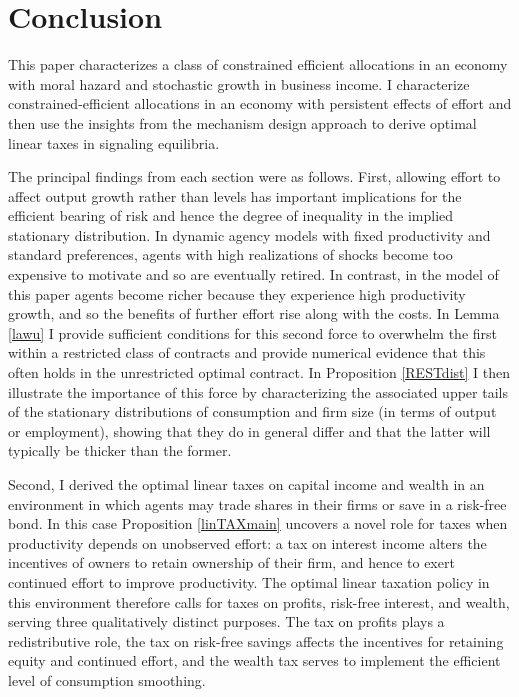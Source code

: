 \documentclass[11pt]{article}
\theoremstyle{plain}
\begin{document}
\section{Conclusion} \label{Conc}

This paper characterizes a class of constrained efficient allocations in an economy with moral hazard and stochastic growth in business income. I characterize constrained-efficient allocations in an economy with persistent effects of effort and then use the insights from the mechanism design approach to derive optimal linear taxes in signaling equilibria. 


The principal findings from each section were as follows. First, allowing effort to affect output growth rather than levels has important implications for the efficient bearing of risk and hence the degree of inequality in the implied stationary distribution. In dynamic agency models with fixed productivity and standard preferences, agents with high realizations of shocks become too expensive to motivate and so are eventually retired. In contrast, in the model of this paper agents become richer because they experience high productivity growth, and so the benefits of further effort rise along with the costs. In Lemma \ref{lawu} I provide sufficient conditions for this second force to overwhelm the first within a restricted class of contracts and provide numerical evidence that this often holds in the unrestricted optimal contract. In Proposition \ref{RESTdist} I then illustrate the importance of this force by characterizing the associated upper tails of the stationary distributions of consumption and firm size (in terms of output or employment), showing that they do in general differ and that the latter will typically be thicker than the former. 


Second, I derived the optimal linear taxes on capital income and wealth in an environment in which agents may trade shares in their firms or save in a risk-free bond. In this case Proposition \ref{linTAXmain} uncovers a novel role for taxes when productivity depends on unobserved effort: a tax on interest income alters the incentives of owners to retain ownership of their firm, and hence to exert continued effort to improve productivity. The optimal linear taxation policy in this environment therefore calls for taxes on profits, risk-free interest, and wealth, serving three qualitatively distinct purposes. The tax on profits plays a redistributive role, the tax on risk-free savings affects the incentives for retaining equity and continued effort, and the wealth tax serves to implement the efficient level of consumption smoothing.
\end{document}
